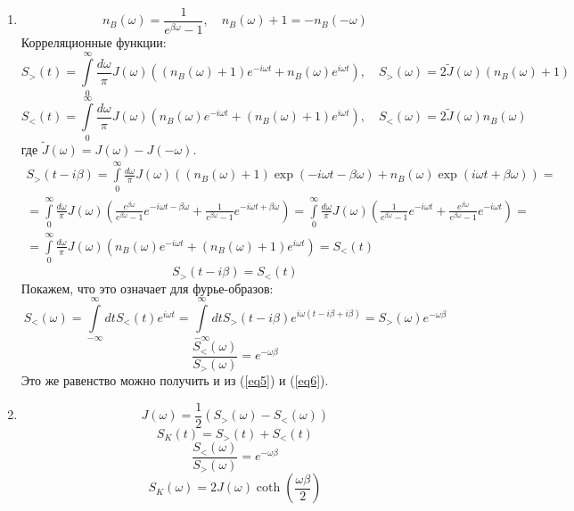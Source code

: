 \documentclass[12pt]{article}
\theoremstyle{definition}
\begin{document}
\begin{enumerate}
    \item 
    \begin{equation}
        n_B(\omega)=\frac{1}{e^{\beta\omega}-1},\quad n_B(\omega)+1=-n_B(-\omega)
    \end{equation}
    Корреляционные функции:
    \begin{equation}\label{eq5}
        S_>(t)=\int\limits_0^\infty\frac{d\omega}{\pi}J(\omega)((n_B(\omega)+1)e^{-i\omega t}+n_B(\omega)e^{i\omega t}),\quad S_>(\omega)=2\tilde{J}(\omega)(n_B(\omega)+1)
    \end{equation}
    \begin{equation}\label{eq6}
        S_<(t)=\int\limits_0^\infty\frac{d\omega}{\pi}J(\omega)(n_B(\omega)e^{-i\omega t}+(n_B(\omega)+1)e^{i\omega t}),\quad S_<(\omega)=2\tilde{J}(\omega)n_B(\omega)
    \end{equation}
    где $\tilde{J}(\omega)=J(\omega)-J(-\omega)$.
    \begin{multline}
        S_>(t-i\beta)=\int\limits_0^\infty\frac{d\omega}{\pi}J(\omega)((n_B(\omega)+1)\exp(-i\omega t-\beta\omega)+n_B(\omega)\exp(i\omega t+\beta\omega))=\\=\int\limits_0^\infty\frac{d\omega}{\pi}J(\omega)\left(\frac{e^{\beta\omega}}{e^{\beta\omega}-1}e^{-i\omega t-\beta\omega}+\frac{1}{e^{\beta\omega}-1}e^{-i\omega t+\beta\omega}\right)=\int\limits_0^\infty\frac{d\omega}{\pi}J(\omega)\left(\frac{1}{e^{\beta\omega}-1}e^{-i\omega t}+\frac{e^{\beta\omega}}{e^{\beta\omega}-1}e^{-i\omega t}\right)=\\=\int\limits_0^\infty\frac{d\omega}{\pi}J(\omega)(n_B(\omega)e^{-i\omega t}+(n_B(\omega)+1)e^{i\omega t})=S_<(t)
    \end{multline}
    \begin{equation}
        \boxed{S_>(t-i\beta)=S_<(t)}
    \end{equation}
    Покажем, что это означает для фурье-образов:
    \begin{equation}
        S_<(\omega)=\int\limits_{-\infty}^\infty dtS_<(t)e^{i\omega t}=\int\limits_{-\infty}^\infty dtS_>(t-i\beta)e^{i\omega(t-i\beta+i\beta)}=S_>(\omega)e^{-\omega\beta}
    \end{equation}
    \begin{equation}
        \boxed{\frac{S_<(\omega)}{S_>(\omega)}=e^{-\omega\beta}}
    \end{equation}
    Это же равенство можно получить и из (\ref{eq5}) и (\ref{eq6}).
    \item
    \begin{equation}
        J(\omega) = \frac{1}{2}(S_>(\omega)-S_<(\omega))
    \end{equation}
    \begin{equation}
        S_K(t)=S_>(t)+S_<(t)
    \end{equation}
    \begin{equation}
        \frac{S_<(\omega)}{S_>(\omega)}=e^{-\omega\beta}
    \end{equation}
    \begin{equation}
        \boxed{S_K(\omega)=2J(\omega)\coth\left(\frac{\omega\beta}{2}\right)}
    \end{equation}
\end{enumerate}
\end{document}
